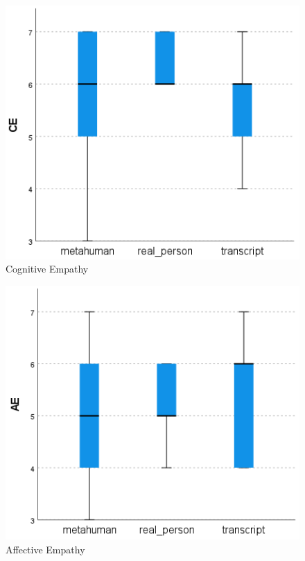 \begin{table}[!htb]
    \begin{minipage}{\linewidth}
        \centering
        \begin{subfigure}{0.49\textwidth}
            \centering
            \includegraphics[width=\linewidth]{figures/KW1.png}
            \caption{Cognitive Empathy}
            \label{fig:sub1}
        \end{subfigure}
        \begin{subfigure}{0.49\textwidth}
            \centering
            \includegraphics[width=\linewidth]{figures/KW2.png}
            \caption{Affective Empathy}
            \label{fig:sub2}
        \end{subfigure}
        \label{fig:kwSamples}
	\end{minipage}
\end{table}

